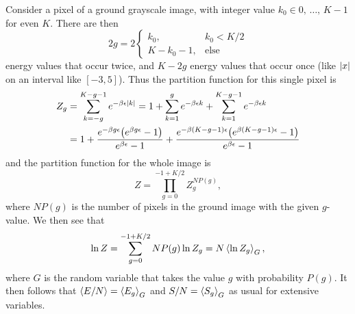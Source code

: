 \documentclass[../notebook.tex]{subfiles}
\begin{document}
\begin{eg}
  Consider a pixel of a ground grayscale image, with integer value $k_0 \in 0,\,
  \ldots,\, K-1$ for even $K$. There are then
  \[
    2g
    = 2\begin{cases}
      k_0, & k_0 < K/2 \\
      K - k_0 - 1, & \text{else}
    \end{cases}
  \]
  energy values that occur twice, and $K - 2g$ energy values that occur once
  (like $\abs{x}$ on an interval like $[-3, 5]$). Thus the partition function
  for this single pixel is
  \begin{align}
    \label{eq:Zpixel}
    Z_g
    &= \sum_{k=-g}^{K-g-1} e^{-\beta\epsilon\abs{k}}
    = 1
    + \sum_{k=1}^g e^{-\beta\epsilon k}
    + \sum_{k=1}^{K-g-1} e^{-\beta\epsilon k} \\
    &= 1
    + \frac{e^{-\beta g\epsilon}\qty(e^{\beta g\epsilon} - 1)}{e^{\beta\epsilon} - 1}
    + \frac{e^{-\beta (K-g-1)\epsilon}\qty(e^{\beta (K-g-1)\epsilon} -
    1)}{e^{\beta\epsilon} - 1}
  \end{align}
  and the partition function for the whole image is
  \begin{equation}
    \label{eq:Zimage}
    Z
    = \prod_{g = 0}^{-1 + K/2} Z_g^{NP(g)},
  \end{equation}
  where $NP(g)$ is the number of pixels in the ground image with the given
  $g$-value. We then see that
  \[
    \ln Z
    = \sum_{g = 0}^{-1 + K/2} NP(g) \ln Z_g
    = N\ev{\ln Z_g}_G,
  \]
  where $G$ is the random variable that takes the value $g$ with probability
  $P(g)$. It then follows that $\ev{E/N} = \ev{E_g}_G$ and $S/N = \ev{S_g}_G$ as
  usual for extensive variables.
\end{eg}
\end{document}
